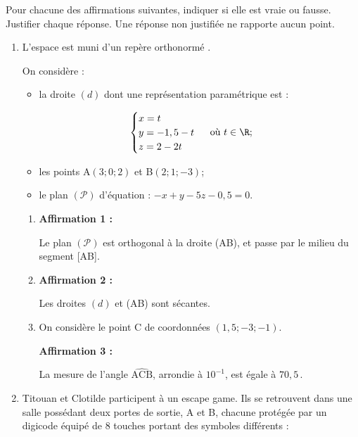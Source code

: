 Pour chacune des affirmations suivantes, indiquer si elle est vraie ou fausse. Justifier chaque réponse. Une réponse non justifiée ne rapporte aucun point.

	\begin{enumerate}[itemsep=1cm]
		\item L'espace est muni d'un repère orthonormé \Oijk{}.

		On considère :

		\begin{itemize}[label={\textbullet~}]
			\item la droite $(d)$ dont une représentation paramétrique est :
		\end{itemize}
		\[\begin{cases}
				x=t \\
			y=-1,5-t \\
			z=2-2 t
		\end{cases}\text { où } t \in \R; \]
		\begin{itemize}[label={\textbullet~}]
			\item les points A$(3 ; 0 ; 2)$ et B$(2 ; 1 ;-3)$;

			\item le plan $(\mathcal{P})$ d'équation : \quad $-x+y-5 z-0,5=0$.
		\end{itemize}

		\begin{enumerate}[itemsep=5mm]
			\item \textbf{Affirmation 1 :}

			Le plan $(\mathcal{P})$ est orthogonal à la droite (AB), et passe par le milieu du segment [AB].

			\item \textbf{Affirmation 2 :}

			Les droites $(d)$ et (AB) sont sécantes.

			\item On considère le point C de coordonnées $(1,5 ; -3 ; -1)$.

			\textbf{Affirmation 3 :}

			La mesure de l'angle $\widehat{\mathrm{ACB}}$, arrondie à $10^{-1}$, est égale à $70,5$\,\textdegree.
		\end{enumerate}

		\item Titouan et Clotilde participent à un escape game. Ils se retrouvent dans une salle possédant deux portes de sortie, A et B, chacune protégée par un digicode équipé de 8 touches portant des symboles différents :


\end{enumerate}

